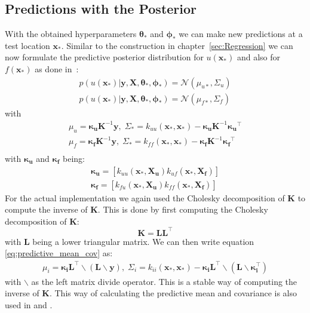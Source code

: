 \documentclass{article}
\begin{document}
\subsection{Predictions with the Posterior}
With the obtained hyperparameters $\bm{\theta_*}$ and $\bm{\phi_*}$ we can make
new predictions at a test location $\bm{x_*}$. Similar to the construction in
chapter~\ref{sec:Regression} we can now formulate the predictive posterior
distribution for $u(\bm{x_*})$ and also for $f(\bm{x_*})$ as done
in~\cite{RAISSI}:
\begin{equation}
    \begin{aligned}
        p(u(\bm{x_*})|\bm{y},\bm{X},\bm{\theta_*}, \bm{\phi_*}) = \mathcal{N}(\mu_{u*}, \Sigma_u) \\
        p(u(\bm{x_*})|\bm{y},\bm{X},\bm{\theta_*}, \bm{\phi_*}) = \mathcal{N}(\mu_{f*}, \Sigma_f)
    \end{aligned}
\end{equation}
with
\begin{equation}
    \begin{aligned}
        \label{eq:predictive_mean_cov}
        \mu_u = \bm{\kappa_u}\bm{K}^{-1}\bm{y}, \; \Sigma_* = k_{uu}(\bm{x_*,x_*}) - \bm{\kappa_u}\bm{K}^{-1}\bm{\kappa_u}^\intercal  \\
        \mu_f = \bm{\kappa_f}\bm{K}^{-1}\bm{y}, \;  \Sigma_* = k_{ff}(\bm{x_*,x_*}) - \bm{\kappa_f}\bm{K}^{-1}\bm{\kappa_f}^\intercal \\
    \end{aligned}
\end{equation}
with $\bm{\kappa_u}$ and $\bm{\kappa_f}$ being:
\begin{equation}
    \begin{aligned}
        \bm{\kappa_u} = [k_{uu}(\bm{x_*},\bm{X_u})k_{uf}(\bm{x_*,\bm{X_f}})] \\
        \bm{\kappa_f} = [k_{fu}(\bm{x_*},\bm{X_u})k_{ff}(\bm{x_*,\bm{X_f}})]
    \end{aligned}
\end{equation}
For the actual implementation we again used the Cholesky decomposition of $\bm{K}$ to compute the inverse of $\bm{K}$. This is done by first computing the Cholesky decomposition of $\bm{K}$:
\begin{equation}
    \bm{K} = \bm{L}\bm{L}^\intercal
\end{equation}
with $\bm{L}$ being a lower triangular matrix. We can then write equation \ref{eq:predictive_mean_cov} as:
\begin{equation}
    \begin{aligned}
        \mu_i = \bm{\kappa_i} \bm{L^{\intercal} \backslash (L\backslash y)}, \; \Sigma_i = k_{ii}(\bm{x_*,x_*}) - \bm{\kappa_i} \bm{L^{\intercal} \backslash (L\backslash \kappa_i^{\intercal})}
    \end{aligned}
\end{equation}
with $\backslash$ as the left matrix divide operator. This is a stable way of computing the inverse of $\bm{K}$. This way of calculating the predictive mean and covariance is also used in \cite{RasmussenCarlEdward} and \cite{RAISSI}.
\end{document}
